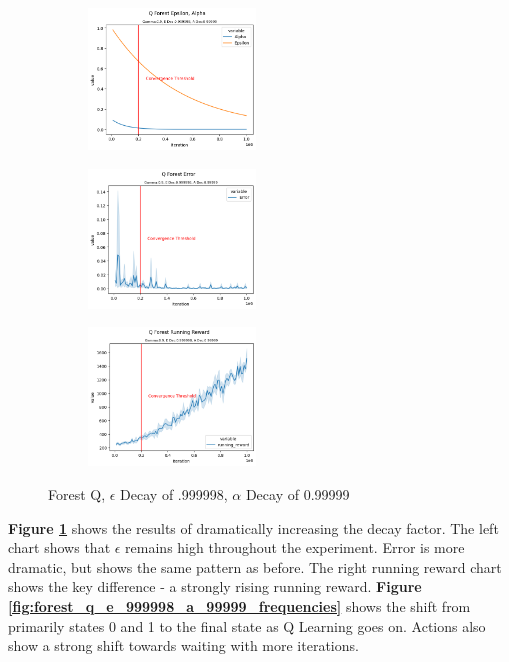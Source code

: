 \documentclass[letterpaper]{article} %
\begin{document}
\begin{figure}[!htb]
	\centering
 	\begin{subfigure}[b]{0.275\textwidth}
		\includegraphics[width=1.75in]{Figures/Q_Forest_Epsilon__Alpha_Gamma_0_9__E_Dec_0_999998__A_Dec_0_99999.png}
  	\end{subfigure}%
	 \begin{subfigure}[b]{0.275\textwidth}
		\includegraphics[width=1.75in]{Figures/Q_Forest_Error_Gamma_0_9__E_Dec_0_999998__A_Dec_0_99999.png}
  	\end{subfigure}
	\begin{subfigure}[b]{0.275\textwidth}
		\includegraphics[width=1.75in]{Figures/Q_Forest_Running_Reward_Gamma_0_9__E_Dec_0_999998__A_Dec_0_99999.png}
  	\end{subfigure}
\caption{Forest Q,  $\epsilon$ Decay of .999998, $\alpha$ Decay of 0.99999}
\label{fig:forest_q_e_999998_a_99999_rewards}
\end{figure}



\textbf{Figure \ref{fig:forest_q_e_999998_a_99999_rewards}} shows the results of dramatically increasing the decay factor.  The left chart shows that $\epsilon$ remains high throughout the experiment.  Error is more dramatic, but shows the same pattern as before.  The right running reward chart shows the key difference - a strongly rising running reward.  \textbf{Figure \ref{fig:forest_q_e_999998_a_99999_frequencies}} shows the shift from primarily states 0 and 1 to the final state as Q Learning goes on.  Actions also show a strong shift towards waiting with more iterations.  
\end{document}
